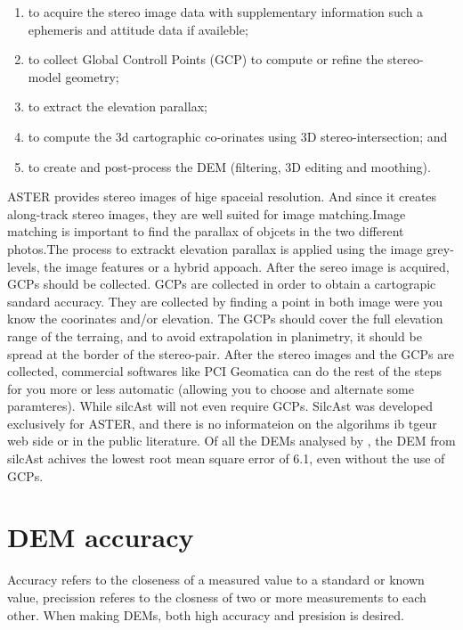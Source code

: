 \documentclass[a4paper,UKenglish]{article}
\begin{document}
\begin{enumerate}
\item to acquire the stereo image data with supplementary information such a ephemeris and attitude data if availeble;
\item to collect Global Controll Points (GCP) to compute or refine the stereo-model geometry;
\item to extract the elevation parallax;
\item to compute the 3d cartographic co-orinates using 3D stereo-intersection; and
\item to create and post-process the DEM (filtering, 3D editing and moothing).
\end{enumerate}

ASTER provides stereo images of hige spaceial resolution. And since it creates along-track stereo images, they are well suited for image matching.Image matching is important to find the parallax of objcets in the two different photos.The process to extrackt elevation parallax is applied using the image grey-levels, the image features or a hybrid appoach. After the sereo image is acquired, GCPs should be collected. GCPs are collected in order to obtain a cartograpic sandard accuracy. They are collected by finding a point in both image were you know the coorinates and/or elevation. The GCPs should cover the full elevation range of the terraing, and to avoid extrapolation in planimetry, it should be spread at the border of the stereo-pair.
After the stereo images and the GCPs are collected, commercial softwares like PCI Geomatica can do the rest of the steps for you more or less automatic (allowing you to choose and alternate some paramteres). While silcAst will not even require GCPs. SilcAst was developed exclusively for ASTER, and there is no informateion on the algorihms ib tgeur web side or in the public literature. Of all the DEMs analysed by \cite{toutin08}, the DEM from silcAst achives the lowest root mean square error of 6.1, even without the use of GCPs.

\section{DEM accuracy}

Accuracy refers to the closeness of a measured value to a standard or known value, precission referes to the closness of two or more measurements to each other. When making DEMs, both high accuracy and presision is desired.



\end{document}
